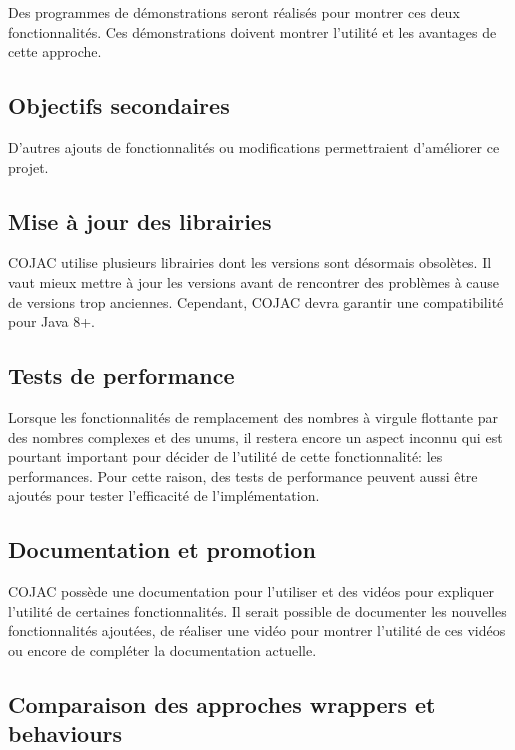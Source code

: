 Des programmes de démonstrations seront réalisés pour montrer ces deux fonctionnalités. Ces démonstrations doivent montrer l'utilité et les avantages de cette approche.

\begin{minipage2}
\section{Objectifs secondaires}

D'autres ajouts de fonctionnalités ou modifications permettraient d'améliorer ce projet.

\subsection{Mise à jour des librairies}

COJAC \cite{COJAC} utilise plusieurs librairies dont les versions sont désormais obsolètes. Il vaut mieux mettre à jour les versions avant de rencontrer des problèmes à cause de versions trop anciennes. Cependant, COJAC \cite{COJAC} devra garantir une compatibilité pour Java 8+.
\end{minipage2}

\subsection{Tests de performance}

Lorsque les fonctionnalités de remplacement des nombres à virgule flottante par des nombres complexes et des unums, il restera encore un aspect inconnu qui est pourtant important pour décider de l'utilité de cette fonctionnalité: les performances. Pour cette raison, des tests de performance peuvent aussi être ajoutés pour tester l'efficacité de l'implémentation.

\subsection{Documentation et promotion}

COJAC possède une documentation pour l'utiliser et des vidéos pour expliquer l'utilité de certaines fonctionnalités. Il serait possible de documenter les nouvelles fonctionnalités ajoutées, de réaliser une vidéo pour montrer l'utilité de ces vidéos ou encore de compléter la documentation actuelle.

\subsection{Comparaison des approches wrappers et behaviours}

